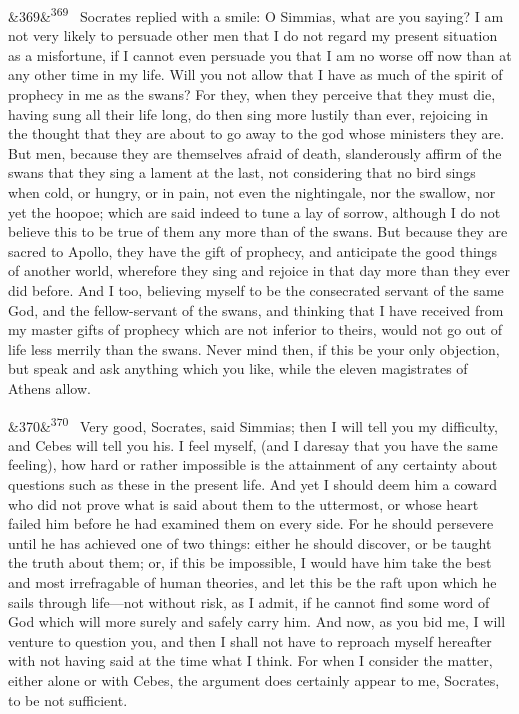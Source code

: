 \documentclass[12pt]{article}
\newcommand{\para}[1][]{\par\noindent\ifx&#1&\else\textsuperscript{\footnotesize #1}~\fi}
\begin{document}
\para[369] Socrates replied with a smile: O Simmias, what are you saying? I am not very likely to persuade other men that I do not regard my present situation as a misfortune, if I cannot even persuade you that I am no worse off now than at any other time in my life. Will you not allow that I have as much of the spirit of prophecy in me as the swans? For they, when they perceive that they must die, having sung all their life long, do then sing more lustily than ever, rejoicing in the thought that they are about to go away to the god whose ministers they are. But men, because they are themselves afraid of death, slanderously affirm of the swans that they sing a lament at the last, not considering that no bird sings when cold, or hungry, or in pain, not even the nightingale, nor the swallow, nor yet the hoopoe; which are said indeed to tune a lay of sorrow, although I do not believe this to be true of them any more than of the swans. But because they are sacred to Apollo, they have the gift of prophecy, and anticipate the good things of another world, wherefore they sing and rejoice in that day more than they ever did before. And I too, believing myself to be the consecrated servant of the same God, and the fellow-servant of the swans, and thinking that I have received from my master gifts of prophecy which are not inferior to theirs, would not go out of life less merrily than the swans. Never mind then, if this be your only objection, but speak and ask anything which you like, while the eleven magistrates of Athens allow.

\para[370] Very good, Socrates, said Simmias; then I will tell you my difficulty, and Cebes will tell you his. I feel myself, (and I daresay that you have the same feeling), how hard or rather impossible is the attainment of any certainty about questions such as these in the present life. And yet I should deem him a coward who did not prove what is said about them to the uttermost, or whose heart failed him before he had examined them on every side. For he should persevere until he has achieved one of two things: either he should discover, or be taught the truth about them; or, if this be impossible, I would have him take the best and most irrefragable of human theories, and let this be the raft upon which he sails through life---not without risk, as I admit, if he cannot find some word of God which will more surely and safely carry him. And now, as you bid me, I will venture to question you, and then I shall not have to reproach myself hereafter with not having said at the time what I think. For when I consider the matter, either alone or with Cebes, the argument does certainly appear to me, Socrates, to be not sufficient.
\end{document}
